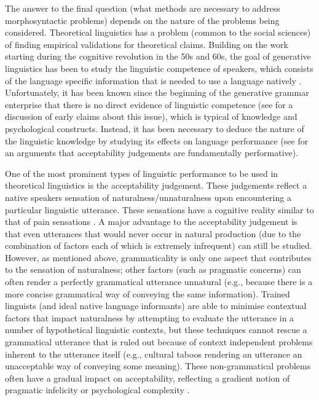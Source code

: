 The answer to the final question (what methods are necessary to address morphosyntactic problems) depends on the nature of the problems being considered. Theoretical linguistics has a problem (common to the social sciences) of finding empirical validations for theoretical claims. Building on the work starting during the cognitive revolution in the 50s and 60s, the goal of generative linguistics has been to study the linguistic competence of speakers, which consists of the language specific information that is needed to use a language natively \citep{Chomsky.1981,Chomsky.1986}. Unfortunately, it has been known since the beginning of the generative grammar enterprise that there is no direct evidence of linguistic competence (see \cite{Schutze.1996} for a discussion of early claims about this issue), which is typical of knowledge and psychological constructs. Instead, it has been necessary to deduce the nature of the linguistic knowledge by studying its effects on language performance (see \citealt{Stroud.2012,Phillips.2013, Phillips.2013b, Phillips.2013c} for an arguments that acceptability judgements are fundamentally performative).

One of the most prominent types of linguistic performance to be used in theoretical linguistics is the acceptability judgement. These judgements reflect a native speakers sensation of naturalness/unnaturalness upon encountering a particular linguistic utterance. These sensations have a cognitive reality similar to that of pain sensations \citep{Schutze.2014}. A major advantage to the acceptability judgement is that even utterances that would never occur in natural production (due to the combination of factors each of which is extremely infrequent) can still be studied. However, as mentioned above, grammaticality is only one aspect that contributes to the sensation of naturalness; other factors (such as pragmatic concerns) can often render a perfectly grammatical utterance unnatural (e.g., because there is a more concise grammatical way of conveying the same information). Trained linguists (and ideal native language informants) are able to minimise contextual factors that impact naturalness by attempting to evaluate the utterance in a number of hypothetical linguistic contexts, but these techniques cannot rescue a grammatical utterance that is ruled out because of context independent problems inherent to the utterance itself (e.g., cultural taboos rendering an utterance an unacceptable way of conveying some meaning). These non-grammatical problems often have a gradual impact on acceptability, reflecting a gradient notion of pragmatic infelicity or psychological complexity \citep{Bresnan.2007,Bresnan.2010,Schutze.2014}.

